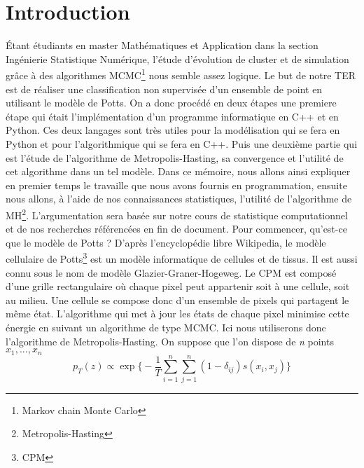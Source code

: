 \chapter*{Introduction}
\newcommand\tab[1][0.8cm]{\hspace*{#1}}

\begin{article}
    Étant étudiants en master Mathématiques et Application dans la section Ingénierie Statistique Numérique, l'étude d'évolution de cluster et de simulation grâce à des algorithmes MCMC\footnote{Markov chain Monte Carlo} nous semble assez logique.
Le but de notre TER est de réaliser une classification non supervisée d'un ensemble de point en utilisant le modèle de Potts.
On a donc procédé en deux étapes une premiere étape qui était l'implémentation d'un programme informatique en C++ et en Python.
Ces deux langages sont très utiles pour la modélisation qui se fera en Python et pour l'algorithmique qui se fera en C++.
Puis une deuxième partie qui est l'étude de l'algorithme de Metropolis-Hasting, sa convergence et l'utilité de cet algorithme dans un tel modèle.
Dans ce mémoire, nous allons ainsi expliquer en premier temps le travaille que nous avons fournis en programmation, ensuite nous allons, à l'aide de nos connaissances statistiques, l'utilité de l'algorithme de MH\footnote{Metropolis-Hasting}.
    \newline L'argumentation sera basée sur notre cours de statistique computationnel et de nos recherches référencées en fin de document.
    \newline \newline
    \tab Pour commencer, qu'est-ce que le modèle de Potts ?
    \newline D'après l'encyclopédie libre Wikipedia, le modèle cellulaire de Potts\footnote{CPM} est un modèle informatique de cellules et de tissus.
    Il est aussi connu sous le nom de modèle Glazier-Graner-Hogeweg.
    Le CPM est composé d'une grille rectangulaire où chaque pixel peut appartenir soit à une cellule, soit au milieu.
    Une cellule se compose donc d'un ensemble de pixels qui partagent le même état.
    L'algorithme qui met à jour les états de chaque pixel minimise cette énergie en suivant un algorithme de type MCMC.
    Ici nous utiliserons donc l'algorithme de Metropolis-Hasting.
    \newline \tab On suppose que l’on dispose de \textit{n} points $x_{1},...,x_{n}$
    \newline \[p_{T}(z)\propto\exp\Bigg\{-\frac{1}{T}\sum_{i=1}^{n}\sum_{j=1}^{n}(1-\delta_{ij})s(x_i,x_j)\Bigg\}\]


\end{article}
